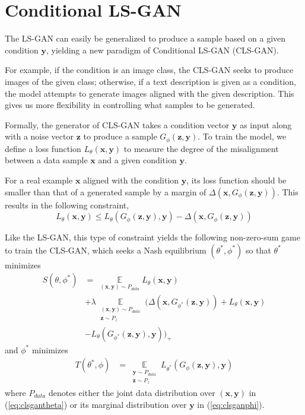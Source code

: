 \documentclass[11pt,fullpage, letterpaper,twoside]{article}
\newcommand{\1}[1]{\mathds{1}_{\left[#1\right]}}
\begin{document}
\section{Conditional LS-GAN}\label{sec:clsgan}
The LS-GAN can easily be generalized to produce a sample based on a given condition $\mathbf y$, yielding a new paradigm of Conditional LS-GAN (CLS-GAN).

For example, if the condition is an image class, the CLS-GAN seeks to produce images of the given class; otherwise, if a text description is given as a condition, the model attempts to generate images aligned with the given description.  This gives us more flexibility in controlling what samples to be generated.

Formally, the generator of CLS-GAN takes a condition vector $\mathbf y$ as input along with a noise vector $\mathbf z$ to produce a sample $G_\phi(\mathbf z, \mathbf y)$.
To train the model, we define a loss function $L_\theta(\mathbf x, \mathbf y)$ to measure the degree of the misalignment between a data sample $\mathbf x$ and a given condition $\mathbf y$.

For a real example $\mathbf x$ aligned with the condition $\mathbf y$, its loss function should be smaller than that of a generated sample by a margin of $\Delta(\mathbf x, G_\phi(\mathbf z,\mathbf y))$.  This results in the following constraint,
\begin{equation}
L_\theta(\mathbf x, \mathbf y) \leq L_\theta(G_\phi(\mathbf z,\mathbf y),\mathbf y) - \Delta(\mathbf x, G_\phi(\mathbf z,\mathbf y))
\end{equation}






Like the LS-GAN, this type of constraint yields the following non-zero-sum game to train the CLS-GAN, which seeks a Nash equilibrium $(\theta^*,\phi^*)$ so that
$\theta^*$ minimizes
\begin{align}\label{eq:clsgantheta}
S(\theta,\phi^*)&= ~\mathop \mathbb E\limits_{(\mathbf x,\mathbf y)\sim P_{data}} L_\theta(\mathbf x, \mathbf y) \\\nonumber
&+ \lambda \mathop \mathbb E\limits_{\substack{(\mathbf x,\mathbf y)\sim P_{data} \\\nonumber
\mathbf z\sim P_z}}\big( \Delta(\mathbf x, G_{\phi^*}(\mathbf z,\mathbf y)) + L_\theta(\mathbf x,\mathbf y) \\\nonumber
&- L_\theta(G_{\phi^*}(\mathbf z,\mathbf y),\mathbf y) \big)_+
\end{align}
and $\phi^*$ minimizes
\begin{align}\label{eq:clsganphi}
T(\theta^*,\phi)&=  \mathop \mathbb E\limits_{\substack{\mathbf y\sim P_{data} \\
\mathbf z\sim P_z}} L_{\theta^*}(G_\phi(\mathbf z,\mathbf y),\mathbf y)
\end{align}
where $P_{data}$ denotes either the joint data distribution over $(\mathbf x, \mathbf y)$ in (\ref{eq:clsgantheta}) or its marginal distribution over $\mathbf y$ in (\ref{eq:clsganphi}).
\end{document}
